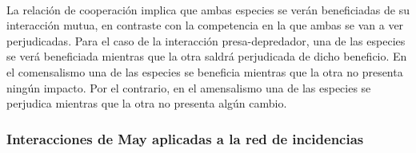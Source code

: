 \\
La relación de cooperación implica que ambas especies se verán beneficiadas de su interacción mutua, en contraste con la competencia en la que ambas se van a ver perjudicadas. Para el caso de la interacción presa-depredador, una de las especies se verá beneficiada mientras que la otra saldrá perjudicada de dicho beneficio. En el  comensalismo una de las especies se beneficia mientras que la otra no presenta ningún impacto. Por el contrario, en el amensalismo una de las especies se perjudica mientras que la otra no presenta algún cambio.

\subsubsection*{Interacciones de May aplicadas a la red de incidencias}

